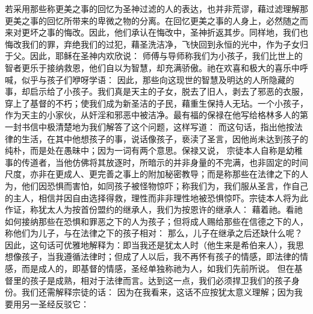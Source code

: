 若采用那些称更美之事的回忆为圣神过滤的人的表达，也并非荒谬，藉过滤理解那更美之事的回忆所带来的卑微之物的分离。在回忆更美之事的人身上，必然随之而来对更坏之事的悔改。因此，他们承认在悔改中，圣神折返其步。同样地，我们也悔改我们的罪，弃绝我们的过犯，藉圣洗洁净，飞快回到永恒的光中，作为子女归于父。因此，耶稣在圣神内欢欣说：  师傅与导师称我们为小孩子，我们比世上的智者更乐于接纳救恩，他们自以为智慧，却充满骄傲。祂在欢喜和极大的喜乐中呼喊，似乎与孩子们咿呀学语：  因此，那些向这现世的智慧及明达的人所隐藏的事，却启示给了小孩子。我们真是天主的子女，脱去了旧人，剥去了邪恶的衣服，穿上了基督的不朽；使我们成为新圣洁的子民，藉重生保持人无玷。一个小孩子，作为天主的小家伙，从奸淫和邪恶中被洁净。最有福的保禄在他写给格林多人的第一封书信中极清楚地为我们解答了这个问题，这样写道：  而这句话，指出他按法律的生活，在其中他想孩子的事，说话像孩子，亵渎了圣言，因他尚未达到孩子的纯朴，而是处在愚昧中；因为一词有两个意思。保禄又说，  宗徒本人自称是幼稚事的传道者，当他仿佛将其放逐时，所暗示的并非身量的不完满，也非固定的时间尺度，亦非在更成人、更完善之事上的附加秘密教导；而是称那些在法律之下的人为，他们因恐惧而害怕，如同孩子被怪物惊吓；称我们为，我们服从圣言，作自己的主人，相信并因自由选择得救，理性而非非理性地被恐惧惊吓。宗徒本人将为此作证，称犹太人为按首份盟约的继承人，我们为按恩许的继承人：  藉着祂。看祂如何接纳那些在恐惧和罪恶之下的人为孩子；但将成人赐给那些在信德之下的人，称他们为儿子，与在法律之下的孩子相对：  那么，儿子在继承之后还缺什么呢？因此，这句话可优雅地解释为：即当我还是犹太人时（他生来是希伯来人），我思想像孩子，当我遵循法律时；但成了人以后，我不再怀有孩子的情感，即法律的情感，而是成人的，即基督的情感，圣经单独称祂为人，如我们先前所说。 但在基督里的孩子是成熟，相对于法律而言。达到这一点，我们必须捍卫我们的孩子身份。我们还需解释宗徒的话：  因为在我看来，这话不应按犹太意义理解；因为我要用另一圣经反驳它：  